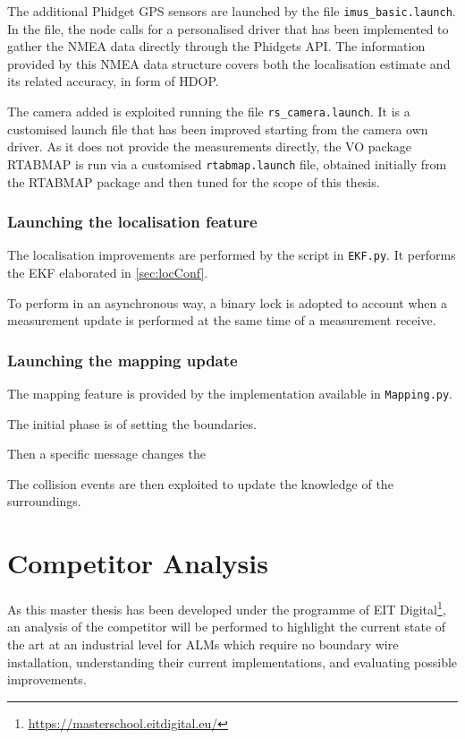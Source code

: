 {The additional Phidget \gls{GPS} sensors are launched by the file \texttt{imus\_basic.launch}.
In the file, the node calls for a personalised driver that has been implemented to gather the \gls{NMEA} data directly through the Phidgets \gls{API}.
The information provided by this \gls{NMEA} data structure covers both the localisation estimate and its related accuracy, in form of \gls{HDOP}.

The camera added is exploited running the file \texttt{rs\_camera.launch}.
It is a customised launch file that has been improved starting from the camera own driver.
As it does not provide the measurements directly, the \gls{VO} package \gls{RTABMAP} is run via a customised \texttt{rtabmap.launch} file, obtained initially from the \gls{RTABMAP} package and then tuned for the scope of this thesis.



\subsection{Launching the localisation feature}
\noindent The localisation improvements are performed by the script in \texttt{EKF.py}.
It performs the \gls{EKF} elaborated in \ref{sec:locConf}.

To perform in an asynchronous way, a binary lock is adopted to account when a measurement update is performed at the same time of a measurement receive.


\subsection{Launching the mapping update}
\noindent The mapping feature is provided by the implementation available in \texttt{Mapping.py}.

The initial phase is of setting the boundaries.

Then a specific message changes the

The collision events are then exploited to update the knowledge of the surroundings.

}


\chapter{Competitor Analysis}
\label{ch:competitors}

\noindent As this master thesis has been developed under the programme of EIT Digital\footnote{\url{https://masterschool.eitdigital.eu/}}, an analysis of the competitor will be performed to highlight the current state of the art at an industrial level for \glspl{ALM} which require no boundary wire installation, understanding their current implementations, and evaluating possible improvements.

